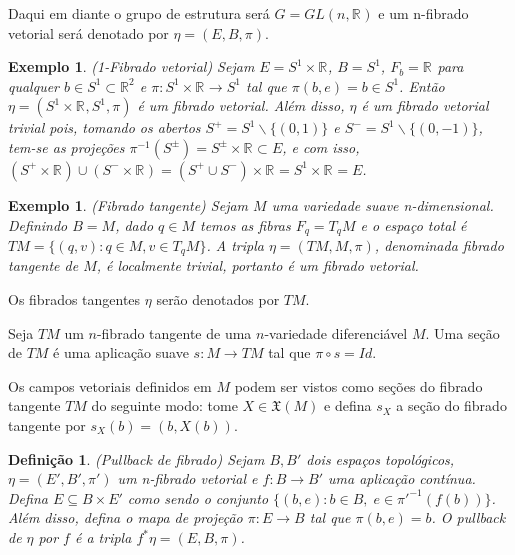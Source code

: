\documentclass[12pt]{book}
\newtheorem{definicao}[teorema]{Definição}
\newtheorem{exemplo}[teorema]{Exemplo}
\newcommand{\campossuaves}[1]{\mathfrak{X}(#1)}
\newcommand{\real}[1]{\mathbb{R}^{#1}}
\begin{document}
	Daqui em diante o grupo de estrutura será $G = GL(n,\real{})$ e um n-fibrado vetorial será denotado por $\eta = (E,B,\pi)$.
	
	\begin{exemplo}
		(1-Fibrado vetorial) Sejam $E=S^{1} \times \real{}$, $B=S^{1}$, $F_{b} = \real{}$ para qualquer $b \in S^{1}\subset \real{2}$ e $\pi:S^{1} \times \real{}\to S^{1}$ tal que $\pi(b, e)=b \in S^{1}$. Então $\eta=(S^{1} \times \real{}, S^{1}, \pi)$ é um fibrado vetorial. Além disso, $\eta$ é um fibrado vetorial trivial pois, tomando os abertos $S^{+} = S^{1} \backslash \{(0,1)\}$ e $S^{-} = S^{1} \backslash \{(0,-1)\}$, tem-se as projeções $\pi^{-1}(S^{\pm}) = S^{\pm} \times \real{} \subset E$, e com isso, $(S^{+}\times\real{}) \cup ( S^{-}\times\real{}) = (S^{+}\cup S^{-})\times\real{} = S^{1} \times\real{} =E$.
	\end{exemplo}
	
	\begin{exemplo}
		(Fibrado tangente) Sejam $M$ uma variedade suave n-dimensional. Definindo $B=M$, dado $q\in M$ temos as fibras $F_{q} = T_{q}M$ e o espaço total é $TM=\{(q, v): q\in M, v\in T_{q}M \}$. A tripla $\eta = (TM, M, \pi)$, denominada fibrado tangente de $M$, é localmente trivial, portanto é um fibrado vetorial.
	\end{exemplo}

	Os fibrados tangentes $\eta$ serão denotados por $TM$.
 
 	Seja $TM$ um $n$-fibrado tangente de uma $n$-variedade diferenciável $M$. Uma seção de $TM$ é uma aplicação suave $s:M \to TM$ tal que $\pi\circ s=Id$.
	
	Os campos vetoriais definidos em $M$ podem ser vistos como seções do fibrado tangente $TM$ do seguinte modo: tome $X\in \campossuaves{M}$ e defina $s_{X}$ a seção do fibrado tangente por $s_{X}(b) = (b, X(b))$.
	
	\begin{definicao}
		(Pullback de fibrado) Sejam $B, B'$ dois espaços topológicos, $\eta=(E', B', \pi')$ um n-fibrado vetorial e $f:B\to B'$ uma aplicação contínua. Defina $E \subseteq B\times E'$ como sendo o conjunto $\{(b, e): b \in B,\; e \in \pi'^{-1}(f(b)) \}$. Além disso, defina o mapa de projeção $\pi:E\to B$ tal que $\pi(b,e) = b$. O pullback de $\eta$ por $f$ é a tripla $f^{*}\eta = (E,B, \pi)$.
	\end{definicao}
	
\end{document}
